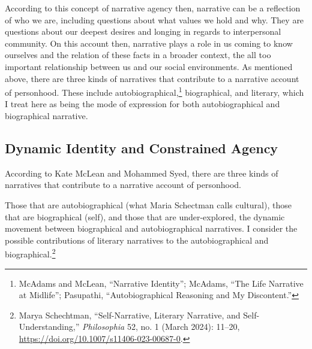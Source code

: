 \documentclass[phdthesis,12pt,final,a4paper]{wuthesis}
\theoremstyle{definition}
\theoremstyle{definition}
\theoremstyle{definition}
\theoremstyle{definition}
\theoremstyle{remark}
\begin{document}
According to this concept of narrative agency then, narrative can be a reflection of who we are, including questions about what values we hold and why. They are questions about our deepest desires and longing in regards to interpersonal community. On this account then, narrative plays a role in us coming to know ourselves and the relation of these facts in a broader context, the all too important relationship between us and our social environments. As mentioned above, there are three kinds of narratives that contribute to a narrative account of personhood. These include autobiographical,\footnote{McAdams and McLean, {``Narrative {Identity}''}; McAdams, {``The {Life Narrative} at {Midlife}''}; Pasupathi, {``Autobiographical {Reasoning} and {My} {Discontent}.''}} biographical, and literary, which I treat here as being the mode of expression for both autobiographical and biographical narrative.

\subsection*{Dynamic Identity and Constrained Agency}\label{dynamic-identity-and-constrained-agency}

According to Kate McLean and Mohammed Syed, there are three kinds of narratives that contribute to a narrative account of personhood.

Those that are autobiographical (what Maria Schectman calls cultural), those that are biographical (self), and those that are under-explored, the dynamic movement between biographical and autobiographical narratives. I consider the possible contributions of literary narratives to the autobiographical and biographical.\footnote{Marya Schechtman, {``Self-{Narrative}, {Literary Narrative}, and {Self-Understanding},''} \emph{Philosophia} 52, no. 1 (March 2024): 11--20, \url{https://doi.org/10.1007/s11406-023-00687-0}.}
\end{document}
